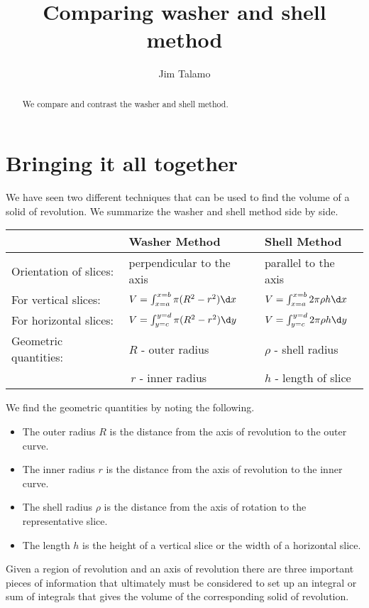 \documentclass{ximera}
\author{Jim Talamo}
\title[Dig-In:]{Comparing washer and shell method}
\begin{document}
\begin{abstract}
 We compare and contrast the washer and shell method.
 \end{abstract}
\maketitle

\section{Bringing it all together}
We have seen two different techniques that can be used to find the volume of a solid of revolution.  We summarize the washer and shell method side by side.

\begin{tabular}{l|l|l}
& \qquad Washer Method & \qquad Shell Method \\
\hline \hline
Orientation of slices: & perpendicular to the axis & parallel to the axis \\
For vertical slices: &$V=\int_{x=a}^{x=b} \pi(R^2-r^2) \d x$ & $V=\int_{x=a}^{x=b} 2\pi \rho h \d x$ \\
For horizontal slices: &$V=\int_{y=c}^{y=d} \pi(R^2-r^2) \d y$ & $V=\int_{y=c}^{y=d} 2\pi \rho h \d y$ \\
Geometric quantities: & $R$ - outer radius & $\rho$ - shell radius \\
&\,$r$ - inner radius & $h$ - length of slice \\
\end{tabular}

We find the geometric quantities by noting the following.

\begin{itemize}
\item The outer radius $R$ is the distance from the axis of revolution to the outer curve.
\item The inner radius $r$ is the distance from the axis of revolution to the inner curve.
\item The shell radius $\rho$ is the distance from the axis of rotation to the representative slice.
\item The length $h$ is the height of a vertical slice or the width of a horizontal slice.
\end{itemize}


Given a region of revolution and an axis of revolution there are three important pieces of information that ultimately must be considered to set up an integral or sum of integrals that gives the volume of the corresponding solid of revolution.
\end{document}
